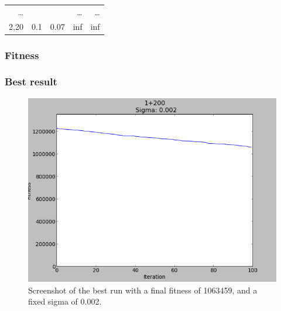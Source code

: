 \documentclass{scrartcl}
\begin{document}
\begin{table}[htbp]
\begin{tabular}{r r r|r r }
\dots & & & \dots & \dots \\
2,20 & 0.1 & 0.07 & inf & inf \\ 
\end{tabular}
\label{}
\end{table}


\subsubsection{Fitness}

\subsubsection{Best result}

\begin{figure}
 \center
 \includegraphics[width=.5\linewidth]{img/ex4/1063459-1+200-0,002.png}
 \caption{Screenshot of the best run with a final fitness of 1063459, and a fixed sigma of 0.002.}
\end{figure}
\end{document}

